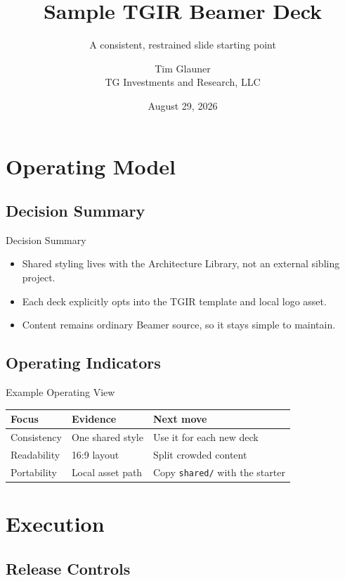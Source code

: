 \documentclass[aspectratio=169]{beamer}
\title[TGIR sample]{Sample TGIR Beamer Deck}
\subtitle{A consistent, restrained slide starting point}
\author{Tim Glauner\\TG Investments and Research, LLC}
\date{August 29, 2026}
\begin{document}
\begin{frame}
  \titlepage
\end{frame}

\section{Operating Model}

\subsection{Decision Summary}

\begin{frame}{Decision Summary}
  \begin{itemize}[<1->]
    \item Shared styling lives with the Architecture Library, not an external sibling project.
    \item Each deck explicitly opts into the TGIR template and local logo asset.
    \item Content remains ordinary Beamer source, so it stays simple to maintain.
  \end{itemize}
\end{frame}

\subsection{Operating Indicators}

\begin{frame}{Example Operating View}
  \centering
  \begin{tabular}{lll}
    \toprule
    Focus & Evidence & Next move \\
    \midrule
    Consistency & One shared style & Use it for each new deck \\
    Readability & 16:9 layout & Split crowded content \\
    Portability & Local asset path & Copy \texttt{shared/} with the starter \\
    \bottomrule
  \end{tabular}
\end{frame}

\section{Execution}

\subsection{Release Controls}
\end{document}
